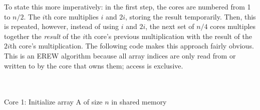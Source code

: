 \documentclass[12pt]{article}
\begin{document}
To state this more imperatively: in the first step, the cores are numbered from 1 to $n/2$. The $i$th core multiplies $i$ and $2i$, storing the result temporarily. Then, this is repeated, however, instead of using $i$ and $2i$, the next set of $n/4$ cores multiples together the \textit{result} of the $i$th core's previous multiplication with the result of the $2i$th core's multiplication. The following code makes this approach fairly obvious. This is an EREW algorithm because all array indices are only read from or written to by the core that owns them; access is exclusive.

\begin{algorithm}[H]
\\
\\

Core 1: Initialize array A of size $n$ in shared memory\\


\end{algorithm}
\end{document}
